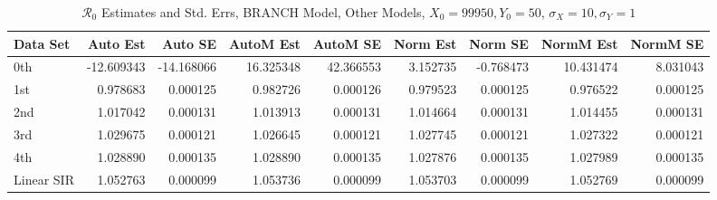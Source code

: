 \documentclass[12pt]{article}
\newcommand{\rr}{\ensuremath{\mathcal{R}_0}}
\begin{document}
\begin{table}[H]
	
	\caption{$\rr$ Estimates and Std. Errs, BRANCH Model,
		Other Models, $X_0 = 99950, Y_0 = 50$, 
		$\sigma_X = 10, \sigma_Y = 1$}
	\begin{footnotesize}
		\hskip -1cm
		\begin{tabular}{l|r|r|r|r|r|r|r|r}
			\hline
			Data Set & Auto Est & Auto SE & AutoM Est & AutoM SE & Norm Est & Norm SE & NormM Est & NormM SE\\
			\hline
			0th & -12.609343 & -14.168066 & 16.325348 & 42.366553 & 3.152735 & -0.768473 & 10.431474 & 8.031043\\
			\hline
			1st & 0.978683 & 0.000125 & 0.982726 & 0.000126 & 0.979523 & 0.000125 & 0.976522 & 0.000125\\
			\hline
			2nd & 1.017042 & 0.000131 & 1.013913 & 0.000131 & 1.014664 & 0.000131 & 1.014455 & 0.000131\\
			\hline
			3rd & 1.029675 & 0.000121 & 1.026645 & 0.000121 & 1.027745 & 0.000121 & 1.027322 & 0.000121\\
			\hline
			4th & 1.028890 & 0.000135 & 1.028890 & 0.000135 & 1.027876 & 0.000135 & 1.027989 & 0.000135\\
			\hline
			Linear SIR & 1.052763 & 0.000099 & 1.053736 & 0.000099 & 1.053703 & 0.000099 & 1.052769 & 0.000099\\
			\hline
		\end{tabular}
	\end{footnotesize}
\end{table}
\end{document}
